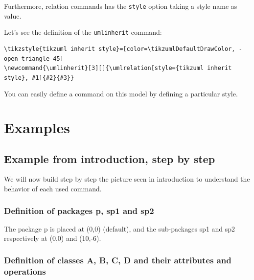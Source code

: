 \documentclass[a4paper,11pt]{report}
\begin{document}
Furthermore, relation commands has the {\tt style} option taking a \TikZ style name as value.

Let's see the definition of the {\tt umlinherit} command:

\begin{lstlisting}
\tikzstyle{tikzuml inherit style}=[color=\tikzumlDefaultDrawColor, -open triangle 45]
\newcommand{\umlinherit}[3][]{\umlrelation[style={tikzuml inherit style}, #1]{#2}{#3}}
\end{lstlisting}

You can easily define a command on this model by defining a particular style.

\section{Examples}

\subsection{Example from introduction, step by step}

We will now build step by step the picture seen in introduction to understand the behavior of each used command.

\subsubsection{Definition of packages p, sp1 and sp2}

The package p is placed at (0,0) (default), and the sub-packages sp1 and sp2 respectively at (0,0) and (10,-6).

	{\color{red!70!black}
		\vspace{-0.4cm}
		\vspace{-0.4cm}
		\vspace{-0.4cm}
		
	}

\begin{center}
\end{center}

\subsubsection{Definition of classes A, B, C, D and their attributes and operations}
\end{document}
